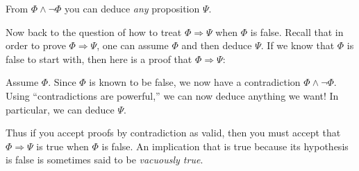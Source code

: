 \documentclass[12pt]{article}
\newcommand{\AND}{\wedge}
\newcommand{\ARR}{\Rightarrow}
\newcommand{\indented}[1]{\begin{adjustwidth}{1em}{}#1\end{adjustwidth}}
\newcommand{\DRULE}[2]{\begin{tcolorbox}[title=Derived Rule: #1,colbacktitle=white,coltitle=black,colback=white]#2\end{tcolorbox}} %
\def\pA{\Phi}
\def\pB{\Psi}
\begin{document}
\DRULE{Contradictions are powerful!}{
From $\pA\AND\neg\pA$ you can deduce \emph{any} proposition $\pB$.
}

Now back to the question of how to treat $\pA\ARR\pB$ when $\pA$ is false.
Recall that in order to prove $\pA\ARR\pB$, one can assume $\pA$ and then deduce $\pB$.
If we know that $\pA$ is false to start with, then here is a proof that $\pA\ARR\pB$:
\indented{
Assume $\pA$.\vsp
Since $\pA$ is known to be false, we now have a contradiction $\pA\AND\neg\pA$.\vsp
Using ``contradictions are powerful,'' we can now deduce anything we want! In particular, we can deduce $\pB$.
}
Thus if you accept proofs by contradiction as valid, then you must accept that $\pA\ARR\pB$ is true when $\pA$ is false.
An implication that is true because its hypothesis is false is sometimes said to be \emph{vacuously true}.
\end{document}
